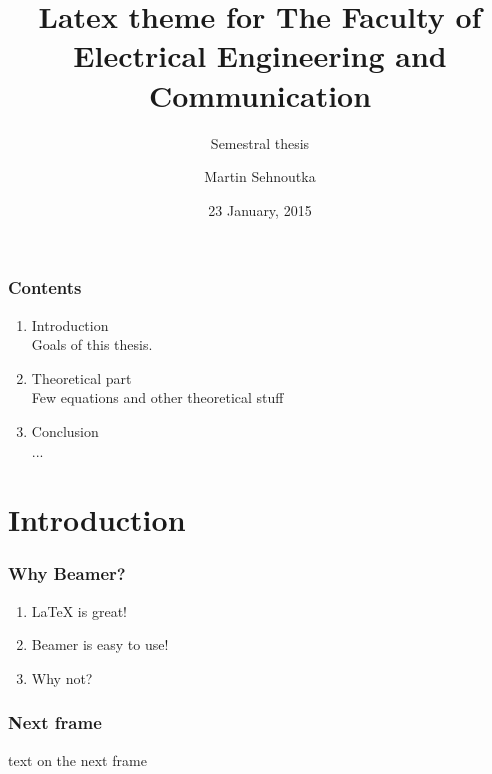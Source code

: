 \documentclass{beamer}
\title{Latex theme for The Faculty of Electrical Engineering and Communication }
\subtitle{Semestral thesis}
\author{Martin Sehnoutka}
\date{23 January, 2015}
\begin{document}
  \frame{\titlepage}
   
  \begin{frame}
	\frametitle{Contents}
	\begin{enumerate}
	  \item Introduction
	  \\ \textcolor{ExecusharesGrey}{\footnotesize\hspace{1em} Goals of this thesis.}	
	  \item Theoretical part
	  \\ \textcolor{ExecusharesGrey}{\footnotesize\hspace{1em} Few equations and other theoretical stuff}
	  \item Conclusion
	  \\ \textcolor{ExecusharesGrey}{\footnotesize\hspace{1em} ...}
	\end{enumerate}
	\end{frame}

	\section{Introduction}
		\begin{frame}
			\frametitle{Why Beamer?}
			\begin{enumerate}
				\item LaTeX is great!
				\item Beamer is easy to use!
				\item Why not?
			\end{enumerate}
		\end{frame}
		
		\begin{frame}
			\frametitle{Next frame}
			text on the next frame
		\end{frame}
\end{document}
